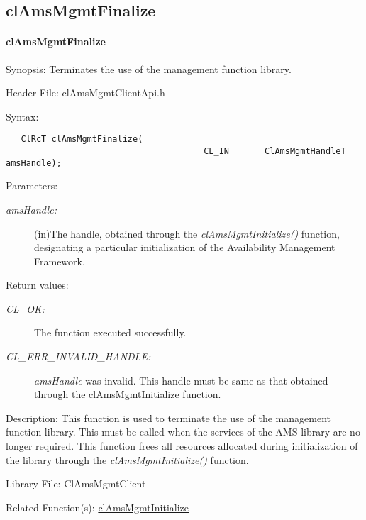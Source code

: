 \subsection{clAmsMgmtFinalize}
\hypertarget{pageams102}{}\paragraph{cl\-Ams\-Mgmt\-Finalize}\label{pageams102}
\begin{Desc}
\item[Synopsis:]Terminates the use of the management function library.\end{Desc}
\begin{Desc}
\item[Header File:]clAmsMgmtClientApi.h\end{Desc}
\begin{Desc}
\item[Syntax:]

\footnotesize\begin{verbatim}   ClRcT clAmsMgmtFinalize(
		                               CL_IN       ClAmsMgmtHandleT            amsHandle);
\end{verbatim}
\normalsize
\end{Desc}
\begin{Desc}
\item[Parameters:]
\begin{description}
\item[{\em ams\-Handle:}](in)The handle, obtained through the \textit{clAmsMgmtInitialize()} function, designating a particular initialization of the Availability Management Framework.\end{description}
\end{Desc}
\begin{Desc}
\item[Return values:]
\begin{description}
\item[{\em CL\_\-OK:}]The function executed successfully. \item[{\em CL\_\-ERR\_\-INVALID\_\-HANDLE:}]{\em ams\-Handle\/} was invalid. This handle must be same as that obtained through the cl\-Ams\-Mgmt\-Initialize function.\end{description}
\end{Desc}
\begin{Desc}
\item[Description:]This function is used to terminate the use of the management function library. 
This must be called when the services of the AMS library are no longer required. This function frees all resources 
allocated during initialization of the library through the \textit{clAmsMgmtInitialize()} function.\end{Desc}
\begin{Desc}
\item[Library File:]Cl\-Ams\-Mgmt\-Client\end{Desc}
\begin{Desc}
\item[Related Function(s):]\hyperlink{pageams101}{cl\-Ams\-Mgmt\-Initialize} \end{Desc}

